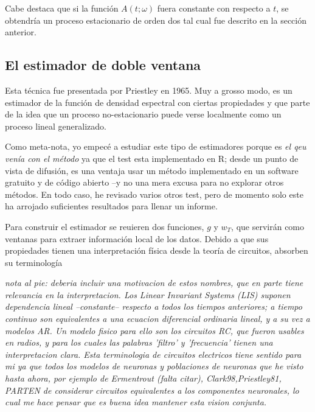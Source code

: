 Cabe destaca que si la funci\'on $A(t;\omega)$ fuera constante con respecto a $t$, se obtendr\'ia
un proceso estacionario de orden dos tal cual fue descrito en la secci\'on anterior.


\subsection{El estimador de doble ventana}

Esta t\'ecnica fue presentada por Priestley en 1965. Muy a grosso modo, es un estimador de la
funci\'on de densidad espectral con ciertas propiedades y que parte de la idea que un proceso
no-estacionario puede verse localmente como un proceso lineal generalizado.

Como meta-nota, yo empec\'e a estudiar este tipo de estimadores porque es \textit{el qeu ven\'ia
con el m\'etodo} ya que el test esta implementado en R; desde un punto de vista de difusi\'on,
es una ventaja usar un m\'etodo implementado en un software gratuito y de c\'odigo abierto --y
no una mera excusa para no explorar otros m\'etodos. En todo caso, he revisado varios otros test,
pero de momento solo este ha arrojado suficientes resultados para llenar un informe.

Para construir el estimador se reuieren dos funciones, $g$ y $w_T$, que servir\'an como ventanas
para extraer informaci\'on local de los datos. Debido a que sus propiedades tienen una interpretaci\'on
f\'isica desde la teor\'ia de circuitos, absorben su terminolog\'ia

\textit{
nota al pie: deberia incluir una motivacion de estos nombres,
que en parte tiene relevancia en la interpretacion. Los 
Linear Invariant Systems (LIS) suponen dependencia lineal
--constante-- respecto a todos los tiempos anteriores; 
a tiempo continuo son equivalentes a una ecuacion diferencial ordinaria lineal,
y a su vez a modelos AR. Un modelo fisico para ello son los circuitos RC, que
fueron usables en radios, y para los cuales las palabras 'filtro' y 'frecuencia'
tienen una interpretacion clara. Esta terminologia de circuitos electricos tiene sentido
para mi ya que todos los modelos de neuronas y poblaciones de neuronas que he visto hasta ahora,
por ejemplo de Ermentrout (falta citar), {Clark98,Priestley81}, PARTEN de considerar
circuitos equivalentes a los componentes neuronales, lo cual me hace pensar que es buena idea
mantener esta vision conjunta.
}


